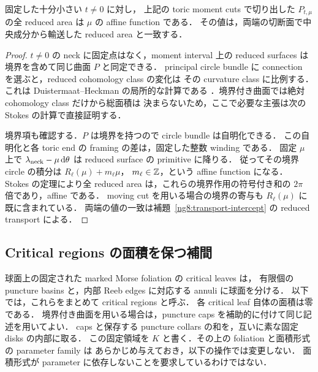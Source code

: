 \begin{lemma}
\label{ng8:relative-dh}
固定した十分小さい $t\ne0$ に対し，
上記の toric moment cuts で切り出した $P_{t,\mu}$ の全 reduced area は
$\mu$ の affine function である．
その値は，両端の切断面で中央成分から輸送した reduced area と一致する．
\end{lemma}

\begin{proof}
$t\ne0$ の neck に固定点はなく，moment interval 上の reduced surfaces は
境界を含めて同じ曲面 $P$ と同定できる．
principal circle bundle に connection を選ぶと，reduced cohomology class の変化は
その curvature class に比例する．これは Duistermaat--Heckman の局所的な計算である
\cite[Chapter~10]{DHJH}．境界付き曲面では絶対 cohomology class だけから総面積は
決まらないため，ここで必要な主張は次の Stokes の計算で直接証明する．

境界項も確認する．$P$ は境界を持つので circle bundle は自明化できる．
この自明化と各 toric end の framing の差は，固定した整数 winding である．
固定 $\mu$ 上で $\lambda_{\rm neck}-\mu\,\mathrm d\theta$ は reduced surface の primitive に降りる．
従ってその境界 circle の積分は $R_\ell(\mu)+m_\ell\mu$，
$m_\ell\in\mathbb Z$，という affine function になる．
Stokes の定理により全 reduced area は，これらの境界作用の符号付き和の
$2\pi$ 倍であり，affine である．
moving cut を用いる場合の境界の寄与も $R_\ell(\mu)$ に既に含まれている．
両端の値の一致は補題~\ref{ng8:transport-intercept} の reduced transport による．
\end{proof}

\subsection{Critical regions の面積を保つ補間}

球面上の固定された marked Morse foliation の critical leaves は，
有限個の puncture basins と，内部 Reeb edges に対応する annuli に球面を分ける．
以下では，これらをまとめて critical regions と呼ぶ．
各 critical leaf 自体の面積は零である．
境界付き曲面を用いる場合は，puncture caps を補助的に付けて同じ記述を用いてよい．
caps と保存する puncture collars の和を，互いに素な固定 disks の内部に取る．
この固定領域を $K$ と書く．その上の foliation と面積形式の parameter family は
あらかじめ与えておき，以下の操作では変更しない．
面積形式が parameter に依存しないことを要求しているわけではない．

